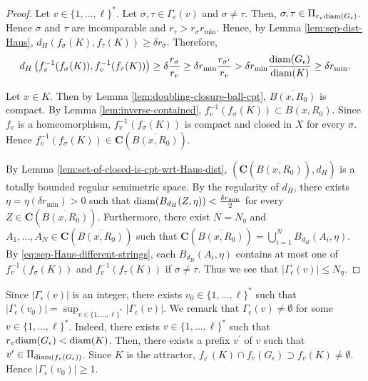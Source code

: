 \documentclass[a4paper, reqno, 11pt]{amsart}
\theoremstyle{definition}
\begin{document}
\begin{proof}
Let $v \in \{1, \dots, \ell\}^{*}$. 
Let $\sigma, \tau \in \Gamma_{\epsilon}(v)$ and $\sigma \ne \tau$. 
Then, $\sigma, \tau \in \Pi_{r_{v} \textup{diam}(G_{\epsilon})}$. 
Hence $\sigma$ and $\tau$ are incomparable and $r_{\tau} > r_{\sigma} r_{\min}$. 
Hence, by Lemma \ref{lem:sep-dist-Haus}, 
$d_H (f_{\sigma}(K), f_{\tau}(K)) \ge \delta r_{\sigma}$. 
Therefore, 
\begin{equation}\label{eq:sep-Haus-different-strings}
d_H \left(f_v^{-1}(f_{\sigma}(K)), f_v^{-1}(f_{\tau}(K)) \right) \ge \delta \frac{r_{\sigma}}{r_{v}}  \ge \delta r_{\min} \frac{r_{\sigma^{\prime}}}{r_{v}} > \delta r_{\min}  \frac{\textup{diam}(G_{\epsilon})}{\textup{diam}(K)} \ge \delta r_{\min}. 
\end{equation} 

Let $x \in K$. 
Then by Lemma \ref{lem:doubling-closure-ball-cpt}, $\overline{B(x,R_0)}$ is compact. 
By Lemma \ref{lem:inverse-contained}, $f_v^{-1} (f_{\sigma}(K)) \subset B(x,R_0)$. 
Since $f_v$ is a homeomorphism, 
$f_v^{-1} (f_{\sigma}(K))$ is compact and closed in $X$ for every $\sigma$. 
Hence $f_v^{-1} (f_{\sigma}(K)) \in \mathbf{C}\left(\overline{B(x,R_0)} \right)$. 

By Lemma \ref{lem:set-of-closed-is-cpt-wrt-Haus-dist}, $\left(\mathbf{C}\left(\overline{B(x,R_0)}\right), d_H \right)$ is a totally bounded regular semimetric space. 
By the regularity of $d_H$, 
there exists $\eta = \eta\left( \delta r_{\min} \right) > 0$ such that $\textup{diam}(B_{d_H} (Z, \eta)) < \frac{\delta r_{\min}}{2}$ for every $Z \in  \mathbf{C}\left(\overline{B(x,R_0)} \right)$. 
Furthermore, there exist $N = N_{\eta}$ and $A_1, \dots, A_N \in  \mathbf{C}\left(\overline{B(x,R_0)} \right)$ such that  $ \mathbf{C}\left(\overline{B(x,R_0)} \right) = \bigcup_{i=1}^{N} B_{d_H}(A_i, \eta)$. 
By \eqref{eq:sep-Haus-different-strings}, each $B_{d_H}(A_i, \eta)$ contains at most one of  $f_v^{-1} (f_{\sigma}(K))$ and $f_v^{-1} (f_{\tau}(K))$ if $\sigma \ne \tau$. 
Thus we see that $ \left|\Gamma_{\epsilon}(v) \right|  \le N_{\eta}$. 
\end{proof}

Since $\left|\Gamma_{\epsilon}(v) \right|$ is an integer, there exists $v_0 \in \{1,\dots, \ell\}^{*}$ such that $\left|\Gamma_{\epsilon}(v_0) \right| = \sup_{v \in \{1, \dots, \ell\}^{*}} \left|\Gamma_{\epsilon}(v) \right|$. 
We remark that $\Gamma_{\epsilon}(v) \ne \emptyset$ for some $v \in \{1, \dots, \ell\}^{*}$.  
Indeed, there exists $v \in \{1,\dots, \ell\}^{*}$ such that $r_{v} \textup{diam}(G_{\epsilon}) < \textup{diam}(K)$. 
Then, there exists a prefix $v^{\prime}$ of $v$ such that $v^{\prime} \in \Pi_{\textup{diam}(f_{v}(G_{\epsilon}))}$. 
Since $K$ is the attractor,  $f_{v^{\prime}}(K) \cap f_{v}(G_{\epsilon}) \supset f_{v}(K) \ne \emptyset$.  
Hence $\left|\Gamma_{\epsilon}(v_0) \right| \ge 1$. 
\end{document}
